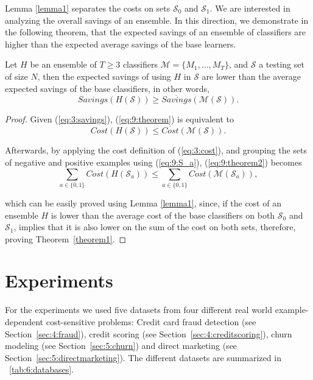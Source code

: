 {  Lemma \ref{lemma1} separates the costs on sets $\mathcal{S}_0$ and  $\mathcal{S}_1$. We are 
  interested in analyzing the overall savings of an ensemble. In this direction, we demonstrate 
  in the following theorem, that the expected savings of an ensemble of classifiers are higher 
  than the expected average savings of the base learners.
  
  \begin{theorem}\label{theorem1}
  Let $H$ be an ensemble of $T\ge3$ classifiers $\mathcal{M}=\{M_1,\dots,M_T\}$, and $\mathcal{S}$ a 
  testing set of size $ N $, then the expected savings of using $H$ in 
  $\mathcal{S}$ are lower than the average expected savings of the base classifiers, in other words,
  \begin{equation}\label{eq:9:theorem}
    Savings(H(\mathcal{S})) \ge \overline{Savings}(\mathcal{M}(\mathcal{S})). 
  \end{equation}
  \end{theorem}
  
  \begin{proof}
  Given (\ref{eq:3:savings}), (\ref{eq:9:theorem}) is equivalent to
  \begin{equation}\label{eq:9:theorem2}
    Cost(H(\mathcal{S})) \le \overline{Cost} (\mathcal{M}(\mathcal{S})). 
  \end{equation}

  \noindent Afterwards, by applying the cost definition of (\ref{eq:3:cost}), and grouping the 
  sets of negative and positive examples using (\ref{eq:9:S_a}), (\ref{eq:9:theorem2}) becomes
  \begin{equation}
    \sum_{a\in \{0,1\}} Cost(H(\mathcal{S}_a)) \le \sum_{a\in \{0,1\}} \overline{Cost} (\mathcal{M} 
    (\mathcal{S}_a)),
  \end{equation}
  
  \noindent which can be easily proved using Lemma \ref{lemma1}, since, if the cost of an ensemble 
  $H$ is  lower than the average cost of the base classifiers on both $\mathcal{S}_0$ and 
  $\mathcal{S}_1$,  implies that it is also lower on the sum of the cost on both sets, 
  therefore, proving Theorem~\ref{theorem1}.
  \end{proof}
  
\section{Experiments}
\label{sec:9:experiments}

For the experiments we used five datasets from four different real world example-dependent 
cost-sensitive problems: Credit card fraud detection (see Section~\ref{sec:4:fraud}), credit 
scoring (see Section~\ref{sec:4:creditscoring}), churn modeling (see Section~\ref{sec:5:churn}) and 
direct marketing (see Section~\ref{sec:5:directmarketing}). The different datasets are summarized 
in \tablename{~\ref{tab:6:databases}}.

}
